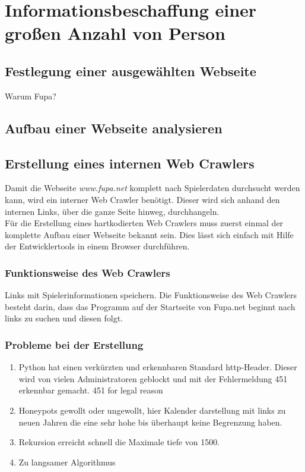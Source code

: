 
\chapter{Informationsbeschaffung einer großen Anzahl von Person}  %
\label{cha:Informationsbeschaffung einer grossen Anzahl von Person} %
\section{Festlegung einer ausgewählten Webseite}
Warum Fupa?
\section{Aufbau einer Webseite analysieren}

\section{Erstellung eines internen Web Crawlers} %
	\label{sse:}
	Damit die Webseite \textit{www.fupa.net} komplett nach Spielerdaten durchsucht werden kann, wird ein interner Web Crawler benötigt. Dieser wird sich anhand den internen Links, über die ganze Seite hinweg, durchhangeln.\\
	Für die Erstellung eines hartkodierten Web Crawlers muss zuerst einmal der komplette Aufbau einer Webseite bekannt sein. Dies lässt sich einfach mit Hilfe der Entwicklertools in einem Browser durchführen. %
	
	\subsection{Funktionsweise des Web Crawlers}
	Links mit Spielerinformationen speichern.
	Die Funktionsweise des Web Crawlers besteht darin, dass das Programm auf der Startseite von Fupa.net beginnt nach links zu suchen und diesen folgt.
	\subsection{Probleme bei der Erstellung} %
	\begin{enumerate}
		\item Python hat einen verkürzten und erkennbaren Standard http-Header. Dieser wird von vielen Administratoren geblockt und mit der Fehlermeldung 451 erkennbar gemacht. 451 for legal reason
		\item Honeypots gewollt oder ungewollt, hier Kalender darstellung mit links zu neuen Jahren die eine sehr hohe bis überhaupt keine Begrenzung haben.
		\item Rekursion erreicht schnell die Maximale tiefe von 1500.
		\item Zu langsamer Algorithmus
	\end{enumerate}
	
